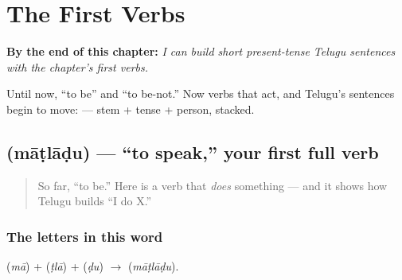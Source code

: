 
\chapter{The First Verbs}
\label{ch:first-verbs}

\begin{chapteropening}
\textbf{By the end of this chapter:} \emph{I can build short present-tense Telugu sentences with the chapter's first verbs.}

Until now, “to be” and “to be-not.” Now verbs that act, and Telugu's sentences begin to move:    — stem + tense + person, stacked.
\end{chapteropening}

\section[\texorpdfstring{\te{మాట్లాడు} (māṭlāḍu)}{మాట్లాడు (māṭlāḍu)}]{ (māṭlāḍu) — \textquotedblleft{}to speak,\textquotedblright{} your first full verb}

\label{lesson:TE-C05-maatlaadu}



\begin{quote}
So far, \textquotedblleft{}to be.\textquotedblright{} Here is a verb that \emph{does} something — and it shows how Telugu builds \textquotedblleft{}I do X.\textquotedblright{}
\end{quote}

\subsection*{The letters in this word}
\textbf{} (\emph{mā}) + \textbf{} (\emph{ṭlā}) + \textbf{} (\emph{ḍu}) $\to$ \textbf{} (\emph{māṭlāḍu}).

